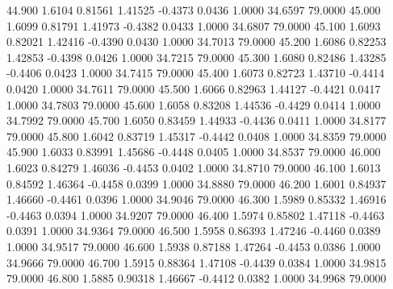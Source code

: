   44.900   1.6104   0.81561   1.41525  -0.4373   0.0436   1.0000  34.6597  79.0000
  45.000   1.6099   0.81791   1.41973  -0.4382   0.0433   1.0000  34.6807  79.0000
  45.100   1.6093   0.82021   1.42416  -0.4390   0.0430   1.0000  34.7013  79.0000
  45.200   1.6086   0.82253   1.42853  -0.4398   0.0426   1.0000  34.7215  79.0000
  45.300   1.6080   0.82486   1.43285  -0.4406   0.0423   1.0000  34.7415  79.0000
  45.400   1.6073   0.82723   1.43710  -0.4414   0.0420   1.0000  34.7611  79.0000
  45.500   1.6066   0.82963   1.44127  -0.4421   0.0417   1.0000  34.7803  79.0000
  45.600   1.6058   0.83208   1.44536  -0.4429   0.0414   1.0000  34.7992  79.0000
  45.700   1.6050   0.83459   1.44933  -0.4436   0.0411   1.0000  34.8177  79.0000
  45.800   1.6042   0.83719   1.45317  -0.4442   0.0408   1.0000  34.8359  79.0000
  45.900   1.6033   0.83991   1.45686  -0.4448   0.0405   1.0000  34.8537  79.0000
  46.000   1.6023   0.84279   1.46036  -0.4453   0.0402   1.0000  34.8710  79.0000
  46.100   1.6013   0.84592   1.46364  -0.4458   0.0399   1.0000  34.8880  79.0000
  46.200   1.6001   0.84937   1.46660  -0.4461   0.0396   1.0000  34.9046  79.0000
  46.300   1.5989   0.85332   1.46916  -0.4463   0.0394   1.0000  34.9207  79.0000
  46.400   1.5974   0.85802   1.47118  -0.4463   0.0391   1.0000  34.9364  79.0000
  46.500   1.5958   0.86393   1.47246  -0.4460   0.0389   1.0000  34.9517  79.0000
  46.600   1.5938   0.87188   1.47264  -0.4453   0.0386   1.0000  34.9666  79.0000
  46.700   1.5915   0.88364   1.47108  -0.4439   0.0384   1.0000  34.9815  79.0000
  46.800   1.5885   0.90318   1.46667  -0.4412   0.0382   1.0000  34.9968  79.0000

